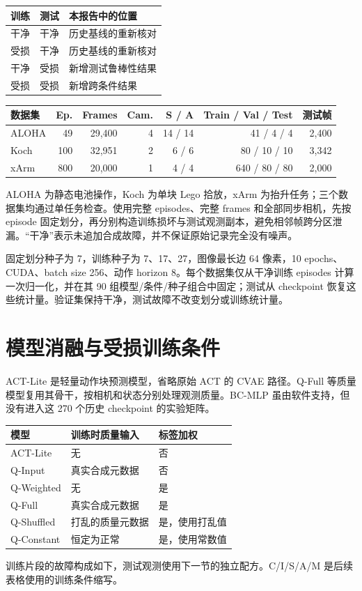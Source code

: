 \documentclass[11pt,a4paper,fontset=fandol]{ctexart}
\begin{document}
\begin{center}
\small
\begin{tabular}{llp{94mm}}
\toprule
训练 & 测试 & 本报告中的位置 \\
\midrule
干净 & 干净 & 历史基线的重新核对 \\
受损 & 干净 & 历史基线的重新核对 \\
干净 & 受损 & 新增测试鲁棒性结果 \\
受损 & 受损 & 新增跨条件结果 \\
\bottomrule
\end{tabular}
\end{center}\begin{center}
\footnotesize
\begin{tabular}{lrrrrrr}
\toprule
数据集 & Ep. & Frames & Cam. & S / A & Train / Val / Test & 测试帧 \\
\midrule
ALOHA & 49 & 29,400 & 4 & 14 / 14 & 41 / 4 / 4 & 2,400 \\
Koch & 100 & 32,951 & 2 & 6 / 6 & 80 / 10 / 10 & 3,342 \\
xArm & 800 & 20,000 & 1 & 4 / 4 & 640 / 80 / 80 & 2,000 \\
\bottomrule
\end{tabular}
\end{center}ALOHA 为静态电池操作，Koch 为单块 Lego 拾放，xArm 为抬升任务；三个数据集均通过单任务检查。使用完整 episodes、完整 frames 和全部同步相机，先按 episode 固定划分，再分别构造训练损坏与测试观测副本，避免相邻帧跨分区泄漏。“干净”表示未追加合成故障，并不保证原始记录完全没有噪声。

固定划分种子为 7，训练种子为 7、17、27，图像最长边 64 像素，10 epochs、CUDA、batch size 256、动作 horizon 8。每个数据集仅从干净训练 episodes 计算一次归一化，并在其 90 组模型/条件/种子组合中固定；测试从 checkpoint 恢复这些统计量。验证集保持干净，测试故障不改变划分或训练统计量。

\clearpage\section{模型消融与受损训练条件}
ACT-Lite 是轻量动作块预测模型，省略原始 ACT 的 CVAE 路径。Q-Full 等质量模型复用其骨干，按相机和状态分别处理观测质量。BC-MLP 虽由软件支持，但没有进入这 270 个历史 checkpoint 的实验矩阵。

\begin{center}
\small
\begin{tabular}{lp{68mm}l}
\toprule
模型 & 训练时质量输入 & 标签加权 \\
\midrule
ACT-Lite & 无 & 否 \\
Q-Input & 真实合成元数据 & 否 \\
Q-Weighted & 无 & 是 \\
Q-Full & 真实合成元数据 & 是 \\
Q-Shuffled & 打乱的质量元数据 & 是，使用打乱值 \\
Q-Constant & 恒定为正常 & 是，使用常数值 \\
\bottomrule
\end{tabular}
\end{center}
训练片段的故障构成如下，测试观测使用下一节的独立配方。C/I/S/A/M 是后续表格使用的训练条件缩写。
\end{document}
